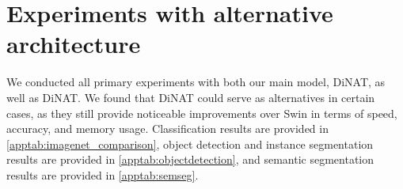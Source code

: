 \section{Experiments with alternative architecture}

\label{appsec:altarchresults}
We conducted all primary experiments with both our main model, DiNAT, as well as DiNAT.
We found that DiNAT could serve as alternatives in certain cases, as they still provide noticeable improvements over Swin in terms of speed, accuracy, and memory usage.
Classification results are provided in \cref{apptab:imagenet_comparison}, object detection and instance segmentation results are provided in \cref{apptab:objectdetection}, and semantic segmentation results are provided in \cref{apptab:semseg}.

\setlength{\tabcolsep}{3pt}
\begin{table}[t]
    \centering
\end{table}
